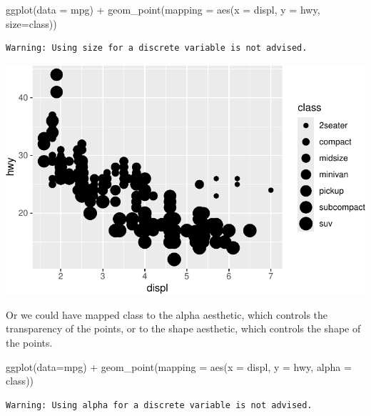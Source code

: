 \documentclass[
  letterpaper,
  DIV=11,
  numbers=noendperiod]{scrreprt}
\newenvironment{Shaded}{\begin{snugshade}}{\end{snugshade}}
\newcommand{\AttributeTok}[1]{\textcolor[rgb]{0.40,0.45,0.13}{#1}}
\newcommand{\FunctionTok}[1]{\textcolor[rgb]{0.28,0.35,0.67}{#1}}
\newcommand{\NormalTok}[1]{\textcolor[rgb]{0.00,0.23,0.31}{#1}}
\newcommand{\SpecialCharTok}[1]{\textcolor[rgb]{0.37,0.37,0.37}{#1}}
\begin{document}
\begin{Shaded}
\begin{Highlighting}[]
\FunctionTok{ggplot}\NormalTok{(}\AttributeTok{data =}\NormalTok{ mpg) }\SpecialCharTok{+}
  \FunctionTok{geom\_point}\NormalTok{(}\AttributeTok{mapping =} \FunctionTok{aes}\NormalTok{(}\AttributeTok{x =}\NormalTok{ displ, }\AttributeTok{y =}\NormalTok{ hwy, }\AttributeTok{size=}\NormalTok{class))}
\end{Highlighting}
\end{Shaded}

\begin{verbatim}
Warning: Using size for a discrete variable is not advised.
\end{verbatim}

\includegraphics{Beginning_Data_Visualization_files/figure-pdf/Example2-1.pdf}

Or we could have mapped class to the alpha aesthetic, which controls the
transparency of the points, or to the shape aesthetic, which controls
the shape of the points.

\begin{Shaded}
\begin{Highlighting}[]
\FunctionTok{ggplot}\NormalTok{(}\AttributeTok{data=}\NormalTok{mpg) }\SpecialCharTok{+}
  \FunctionTok{geom\_point}\NormalTok{(}\AttributeTok{mapping =} \FunctionTok{aes}\NormalTok{(}\AttributeTok{x =}\NormalTok{ displ, }\AttributeTok{y =}\NormalTok{ hwy, }\AttributeTok{alpha =}\NormalTok{ class))}
\end{Highlighting}
\end{Shaded}

\begin{verbatim}
Warning: Using alpha for a discrete variable is not advised.
\end{verbatim}
\end{document}
